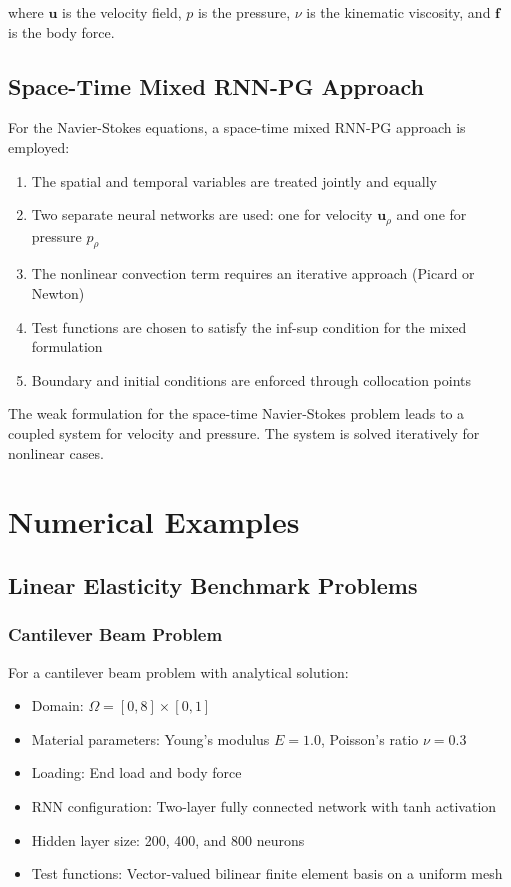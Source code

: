 \documentclass[11pt,a4paper]{article}
\begin{document}
where $\mathbf{u}$ is the velocity field, $p$ is the pressure, $\nu$ is the kinematic viscosity, and $\mathbf{f}$ is the body force.

\subsection{Space-Time Mixed RNN-PG Approach}

For the Navier-Stokes equations, a space-time mixed RNN-PG approach is employed:

\begin{enumerate}
    \item The spatial and temporal variables are treated jointly and equally
    \item Two separate neural networks are used: one for velocity $\mathbf{u}_\rho$ and one for pressure $p_\rho$
    \item The nonlinear convection term requires an iterative approach (Picard or Newton)
    \item Test functions are chosen to satisfy the inf-sup condition for the mixed formulation
    \item Boundary and initial conditions are enforced through collocation points
\end{enumerate}

The weak formulation for the space-time Navier-Stokes problem leads to a coupled system for velocity and pressure. The system is solved iteratively for nonlinear cases.

\section{Numerical Examples}

\subsection{Linear Elasticity Benchmark Problems}

\subsubsection{Cantilever Beam Problem}

For a cantilever beam problem with analytical solution:

\begin{itemize}
    \item Domain: $\Omega = [0,8] \times [0,1]$
    \item Material parameters: Young's modulus $E = 1.0$, Poisson's ratio $\nu = 0.3$
    \item Loading: End load and body force
    \item RNN configuration: Two-layer fully connected network with tanh activation
    \item Hidden layer size: 200, 400, and 800 neurons
    \item Test functions: Vector-valued bilinear finite element basis on a uniform mesh
\end{itemize}
\end{document}
